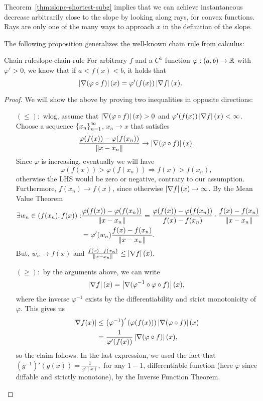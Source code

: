 Theorem~\ref{thm:slope-shortest-subg} implies that we can achieve instantaneous
decrease arbitrarily close to the slope by looking along rays, for convex
functions. Rays are only one of the many ways to approach $x$ in the definition
of the slope.

The following proposition generalizes the well-known chain rule from calculus:
\begin{cproposition}{Chain rule}{slope-chain-rule}
	For arbitrary $f$ and a $C^1$ function $\varphi: (a, b) \to \mathbb{R}$ with
	$\varphi' > 0$, we know that if $a < f(x) < b$, it holds that
	\[
		\left| \nabla (\varphi \circ f) \right|(x) = \varphi'(f(x)) \left| \nabla f \right|(x).
	\]
\end{cproposition}
\begin{proof}
	We will show the above by proving two inequalities in opposite directions:
	\begin{enumerate}
		\item[$(\leq):$] wlog, assume that $\left| \nabla (\varphi \circ f) \right|(x) > 0$
			and $\varphi'(f(x)) \left| \nabla f \right|(x) < \infty$. Choose a sequence
			$\left\{ x_n \right\}_{n=1}^{\infty}$, $x_n \to x$ that satisfies
			\[
				\frac{\varphi(f(x)) - \varphi(f(x_n))}{\left \| x - x_n \right \|}
				\to \left| \nabla (\varphi \circ f) \right|(x).
			\]
			Since $\varphi$ is increasing, eventually we will have
			\[
				\varphi(f(x)) > \varphi(f(x_n)) \Rightarrow
				f(x) > f(x_n),
			\]
			otherwise the LHS would be zero or negative, contrary to our
			assumption. Furthermore, $f(x_n) \to f(x)$, since otherwise
			$\left| \nabla f \right|(x) \to \infty$. By the Mean Value Theorem
			\begin{align*}
				\exists w_n \in (f(x_n), f(x)): & \frac{\varphi(f(x)) -
				\varphi(f(x_n))}{\left \| x - x_n \right \|} =
				\frac{\varphi(f(x)) - \varphi(f(x_n))}{f(x) - f(x_n)}
				\cdot \frac{f(x) - f(x_n)}{\left \| x - x_n \right \|} \\
				&= \varphi'(w_n) \frac{f(x) - f(x_n)}{\left \| x - x_n \right \|}.
			\end{align*}
			But, $w_n \to f(x)$ and $\frac{f(x) - f(x_n)}{\left \| x - x_n \right \|} \leq
			\left| \nabla f \right|(x)$.
		\item[$(\geq):$] by the arguments above, we can write
			\[
				\left| \nabla f \right|(x) = \left| \nabla(\varphi^{-1} \circ \varphi \circ
				f) \right|(x), \]
			where the inverse $\varphi^{-1}$ exists by the differentiability
			and strict monotonicity of $\varphi$. This gives us
			\begin{align*}
				\left| \nabla f(x) \right| &\leq \left( \varphi^{-1} \right)'(\varphi(f(x)))
					\left| \nabla (\varphi \circ f) \right|(x) \\
					&= \frac{1}{\varphi'(f(x))} \left| \nabla (\varphi \circ
				f) \right|(x),
			\end{align*}
			so the claim follows. In the last expression, we used the fact that
			\(
				(g^{-1})'(g(x)) = \frac{1}{g'(x)},
			\) for any $1-1$, differentiable function (here $\varphi$ since
			diffable and strictly monotone), by the Inverse Function Theorem.
	\end{enumerate}
\end{proof}
